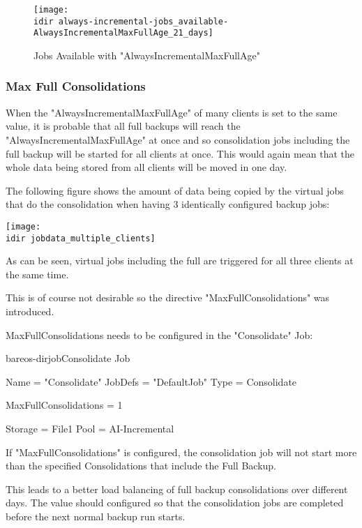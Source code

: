 \begin{figure}[htbp]
\centering
\texttt{[image: \\idir always-incremental-jobs\_available-AlwaysIncrementalMaxFullAge\_21\_days]}
\caption{Jobs Available with "AlwaysIncrementalMaxFullAge"
}
\end{figure}%

\subsubsection{Max Full Consolidations}

When the "AlwaysIncrementalMaxFullAge" of many clients is set to the same value, it is probable that all full backups will reach the "AlwaysIncrementalMaxFullAge" at once and so consolidation jobs including the full backup will be started for all clients at once. This would again mean that the whole data being stored from all clients will be moved in one day.

The following figure shows the amount of data being copied by the virtual jobs that do the consolidation when having 3 identically configured backup jobs:

\begin{center}
\texttt{[image: \\idir jobdata\_multiple\_clients]}
\end{center}

As can be seen, virtual jobs including the full are triggered for all three clients at the same time.

This is of course not desirable so the directive "MaxFullConsolidations" was introduced.

MaxFullConsolidations needs to be configured in the "Consolidate" Job:

\begin{bareosConfigResource}{bareos-dir}{job}{Consolidate}
Job {
  Name = "Consolidate"
  JobDefs = "DefaultJob"
  Type = Consolidate

  MaxFullConsolidations = 1

  Storage = File1
  Pool = AI-Incremental
}
\end{bareosConfigResource}


If "MaxFullConsolidations" is configured, the consolidation job will not start more than the specified Consolidations that include the Full Backup.


This leads to a better load balancing of full backup consolidations over different days. 
The value should configured so that the consolidation jobs are completed before the next normal backup run starts.

